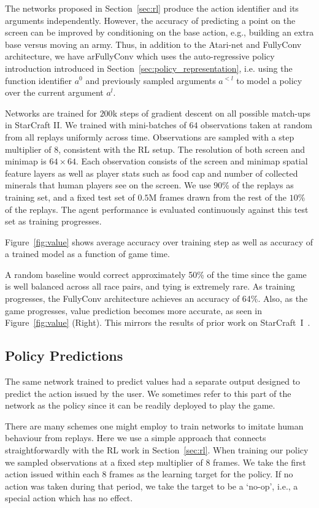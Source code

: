 The networks proposed in Section~\ref{sec:rl} produce the action identifier and its arguments independently. However, the accuracy of predicting a point on the screen can be improved by conditioning on the base action, e.g., building an extra base versus moving an army. Thus, in addition to the Atari-net and FullyConv architecture, we have arFullyConv which uses the auto-regressive policy introduction introduced in Section~\ref{sec:policy_representation}, i.e. using the function identifier $a^0$ and previously sampled arguments $a^{<l}$ to model a policy over the current argument $a^l$.

Networks are trained for $200$k steps of gradient descent on all possible match-ups in StarCraft II. We trained with mini-batches of $64$ observations taken at random from all replays uniformly across time. Observations are sampled with a step multiplier of $8$, consistent with the RL setup. The resolution of both screen and minimap is $64\times 64$. Each observation consists of the screen and minimap spatial feature layers as well as player stats such as food cap and number of collected minerals that human players see on the screen. We use $90$\% of the replays as training set, and a fixed test set of $0.5$M frames drawn from the rest of the $10$\% of the replays. The agent performance is evaluated continuously against this test set as training progresses.  

Figure~\ref{fig:value} shows average accuracy over training step as well as accuracy of a trained model as a function of game time.

A random baseline would correct approximately 50\% of the time since the game is well balanced across all race pairs, and tying is extremely rare. As training progresses, the FullyConv architecture achieves an accuracy of 64\%.  Also, as the game progresses, value prediction becomes more accurate, as seen in Figure~\ref{fig:value} (Right). This mirrors the results of prior work on StarCraft~I~\cite{erickson2014global}.

\subsection{Policy Predictions}

The same network trained to predict values had a separate output designed to predict the action issued by the user. We sometimes refer to this part of the network as the policy since it can be readily deployed to play the game. 

There are many schemes one might employ to train networks to imitate human behaviour from replays.  Here we use a simple approach that connects straightforwardly with the RL work in Section~\ref{sec:rl}. When training our policy we sampled observations at a fixed step multiplier of $8$ frames. We take the first action issued within each $8$ frames as the learning target for the policy. If no action was taken during that period, we take the target to be a `no-op', i.e., a special action which has no effect. 

